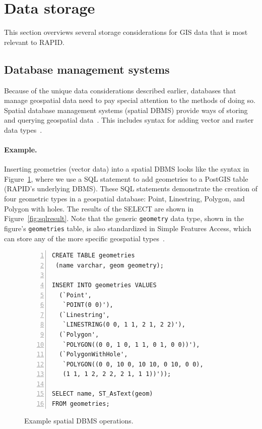 \section{Data storage}
\label{storage}
This section overviews several storage considerations for GIS data that is most relevant to RAPID.

\subsection{Database management systems}
Because of the unique data considerations described earlier, databases that manage geospatial data need to pay special attention to the methods of doing so. Spatial database management systems (spatial DBMS) provide ways of storing and querying geospatial data~\cite{Boundless}. This includes syntax for adding vector and raster data types~\cite{Boundless}.

\paragraph{Example.}
\label{background_wkt}
Inserting geometries (vector data) into a spatial DBMS looks like the syntax in Figure~\ref{fig:spatialsql}, where we use a SQL statement to add geometries to a PostGIS table (RAPID's underlying DBMS). These SQL statements demonstrate the creation of four geometric types in a geospatial database: Point, Linestring, Polygon, and Polygon with holes. The results of the SELECT are shown in Figure~\ref{fig:sqlresult}. Note that the generic \texttt{geometry} data type, shown in the figure's \texttt{geometries} table, is also standardized in Simple Features Access, which can store any of the more specific geospatial types~\cite{Boundless,SFA}.

\begin{figure}
\begin{Verbatim}[samepage=true,baselinestretch=1,numbers=left,xleftmargin=12mm]
CREATE TABLE geometries
 (name varchar, geom geometry);

INSERT INTO geometries VALUES
  (`Point',
   `POINT(0 0)'),
  (`Linestring',
   `LINESTRING(0 0, 1 1, 2 1, 2 2)'),
  (`Polygon',
   `POLYGON((0 0, 1 0, 1 1, 0 1, 0 0))'),
  (`PolygonWithHole',
   `POLYGON((0 0, 10 0, 10 10, 0 10, 0 0),
   (1 1, 1 2, 2 2, 2 1, 1 1))'));

SELECT name, ST_AsText(geom)
FROM geometries;
\end{Verbatim}
\caption{Example spatial DBMS operations.}
\label{fig:spatialsql}
\end{figure}


